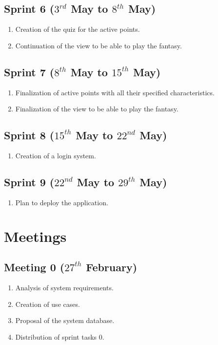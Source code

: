 \subsection{Sprint 6 ($3^{rd}$ May to $8^{th}$ May)}
\begin{enumerate}
	\item Creation of the quiz for the active points.
	\item Continuation of the view to be able to play the fantasy.
\end{enumerate}

\subsection{Sprint 7 ($8^{th}$ May to $15^{th}$ May)}
\begin{enumerate}
	\item Finalization of active points with all their specified characteristics.
	\item Finalization of the view to be able to play the fantasy.
\end{enumerate}

\subsection{Sprint 8 ($15^{th}$ May to $22^{nd}$ May)}
\begin{enumerate}
	\item Creation of a login system.
\end{enumerate}

\subsection{Sprint 9 ($22^{nd}$ May to $29^{th}$ May)}
\begin{enumerate}
	\item Plan to deploy the application.
\end{enumerate}

\section{Meetings}
\subsection{Meeting 0 ($27^{th}$ February)}
\begin{enumerate}
	\item Analysis of system requirements.
	\item Creation of use cases.
	\item Proposal of the system database.
	\item Distribution of sprint tasks 0.
\end{enumerate}

